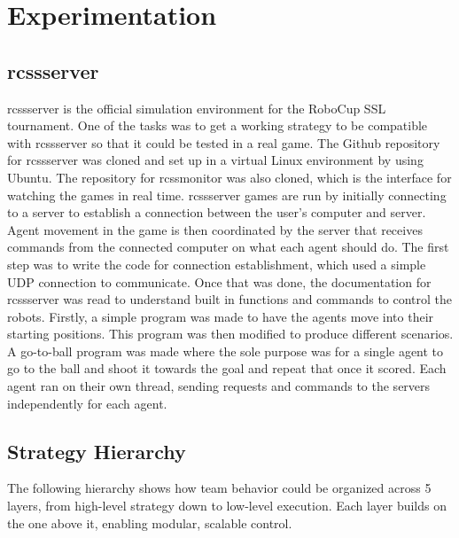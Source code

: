 \section{Experimentation}

\subsection{rcssserver}
rcssserver is the official simulation environment for the RoboCup SSL tournament\cite{rcssserverManual}. One of the tasks was to get a working strategy to be compatible with rcssserver so that it could be tested in a real game. The Github repository for rcssserver was cloned and set up in a virtual Linux environment by using Ubuntu. The repository for rcssmonitor was also cloned, which is the interface for watching the games in real time. rcssserver games are run by initially connecting to a server to establish a connection between the user's computer and server. Agent movement in the game is then coordinated by the server that receives commands from the connected computer on what each agent should do. The first step was to write the code for connection establishment, which used a simple UDP connection to communicate. Once that was done, the documentation for rcssserver was read to understand built in functions and commands to control the robots. Firstly, a simple program was made to have the agents move into their starting positions. This program was then modified to produce different scenarios. A go-to-ball program was made where the sole purpose was for a single agent to go to the ball and shoot it towards the goal and repeat that once it scored. Each agent ran on their own thread, sending requests and commands to the servers independently for each agent.

\subsection{Strategy Hierarchy}
The following hierarchy shows how team behavior could be organized across 5 layers, from high-level strategy down to low-level execution. Each layer builds on the one above it, enabling modular, scalable control.

